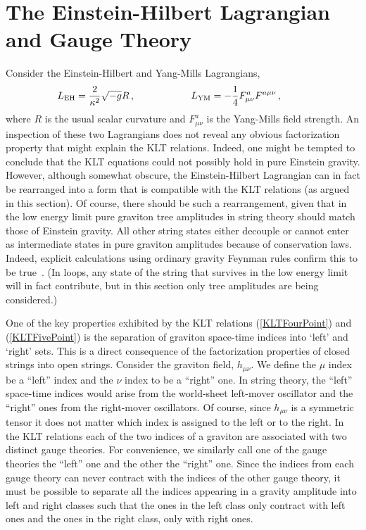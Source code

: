 \newpage

\section{The Einstein-Hilbert Lagrangian and Gauge Theory}
\label{section:EinsteinHilbert}

Consider the Einstein-Hilbert and Yang-Mills Lagrangians,
%
\begin{equation}
L_{\rm EH} = {2 \over \kappa^2} \sqrt{-g} R \,, \hskip 2 cm 
L_{\rm YM} = - {1\over 4} F^a_{\mu\nu} F^{a\mu\nu}\,, \hskip 1 cm 
\end{equation}
%
where $R$ is the usual scalar curvature and $F_{\mu\nu}^a$ is the
Yang-Mills field strength. An inspection of these two Lagrangians does
not reveal any obvious factorization property that might explain the
KLT relations.  Indeed, one might be tempted to conclude that the KLT
equations could not possibly hold in pure Einstein gravity.  However, 
although somewhat obscure, the Einstein-Hilbert Lagrangian can in fact be 
rearranged into a form that is  compatible with the KLT relations (as 
argued in this section). Of course,  there should be such a rearrangement, 
given that in the low energy limit pure graviton tree
amplitudes in string theory should match those of Einstein gravity.
All other string states either decouple or cannot enter as
intermediate states in pure graviton amplitudes because of
conservation laws.  Indeed, explicit calculations using ordinary
gravity Feynman rules confirm this to be
true~\cite{Sannan86,BernGrant,Square}. (In loops, any state of the string
that survives in the low energy limit will in fact contribute, but
in this section only tree amplitudes are being considered.)

One of the key properties exhibited by the KLT relations
(\ref{KLTFourPoint}) and (\ref{KLTFivePoint}) is the separation of
graviton space-time indices into `left' and `right' sets. This is a
direct consequence of the factorization properties of closed strings
into open strings.  Consider the graviton field, $h_{\mu\nu}$.  We
define the $\mu$ index be a ``left'' index and the $\nu$ index to be a
``right'' one.  In string theory, the ``left'' space-time indices would
arise from the world-sheet left-mover oscillator and the ``right'' ones
from the right-mover oscillators.  Of course, since $h_{\mu\nu}$ is a
symmetric tensor it does not matter which index is assigned to the
left or to the right.  In the KLT relations each of the two indices of
a graviton are associated with two distinct gauge theories. For
convenience, we similarly call one of the gauge theories the ``left''
one and the other the ``right'' one. Since the indices from each
gauge theory can never contract with the indices of the other gauge
theory, it must be possible to separate all the indices appearing in a
gravity amplitude into left and right classes such that the ones in
the left class only contract with left ones and the ones in the right
class, only with right ones. 

